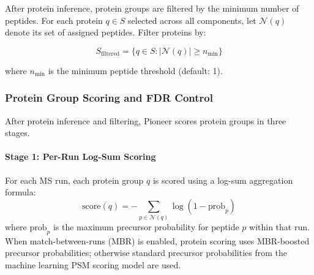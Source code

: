 \documentclass[pdflatex,sn-nature]{sn-jnl}
\begin{document}
After protein inference, protein groups are filtered by the minimum number of peptides. For each protein $q \in S$ selected across all components, let $\mathcal{N}(q)$ denote its set of assigned peptides. Filter proteins by:

\begin{equation}
S_{\text{filtered}} = \{q \in S : |\mathcal{N}(q)| \geq n_{\text{min}}\}
\end{equation}

where $n_{\text{min}}$ is the minimum peptide threshold (default: 1).

\subsubsection{Protein Group Scoring and FDR Control}

After protein inference and filtering, Pioneer scores protein groups in three stages. 

\paragraph{Stage 1: Per-Run Log-Sum Scoring} For each MS run, each protein group $q$ is scored using a log-sum aggregation formula:
\begin{equation}
\text{score}(q) = -\sum_{p \in \mathcal{N}(q)} \log(1 - \text{prob}_p)
\end{equation}
where $\text{prob}_p$ is the maximum precursor probability for peptide $p$ within that run. When match-between-runs (MBR) is enabled, protein scoring uses MBR-boosted precursor probabilities; otherwise standard precursor probabilities from the machine learning PSM scoring model are used.
\end{document}
